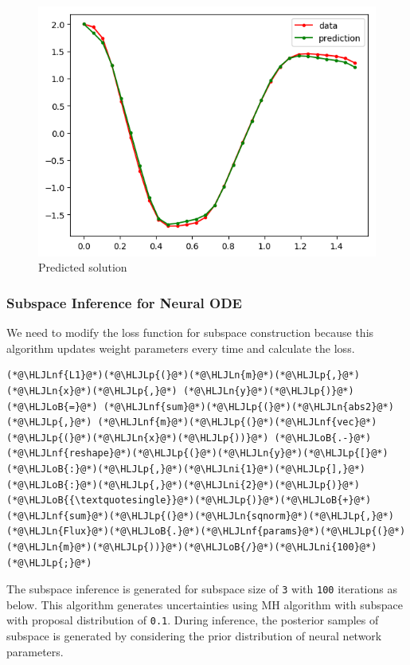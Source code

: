\documentclass[12pt,a4paper]{article}
\newcommand{\HLJLn}[1]{#1}
\newcommand{\HLJLnf}[1]{\textcolor[RGB]{66,102,213}{#1}}
\newcommand{\HLJLni}[1]{\textcolor[RGB]{59,151,46}{#1}}
\newcommand{\HLJLoB}[1]{\textcolor[RGB]{102,102,102}{\textbf{#1}}}
\newcommand{\HLJLp}[1]{#1}
\begin{document}
\begin{figure}
\centering
\includegraphics{img/n_ode_trained.png}
\caption{Predicted solution}
\end{figure}


\subsubsection{Subspace Inference for Neural ODE}
We need to modify the loss function for subspace construction because this algorithm updates weight parameters every time and calculate the loss.


\begin{lstlisting}
(*@\HLJLnf{L1}@*)(*@\HLJLp{(}@*)(*@\HLJLn{m}@*)(*@\HLJLp{,}@*) (*@\HLJLn{x}@*)(*@\HLJLp{,}@*) (*@\HLJLn{y}@*)(*@\HLJLp{)}@*) (*@\HLJLoB{=}@*) (*@\HLJLnf{sum}@*)(*@\HLJLp{(}@*)(*@\HLJLn{abs2}@*)(*@\HLJLp{,}@*) (*@\HLJLnf{m}@*)(*@\HLJLp{(}@*)(*@\HLJLnf{vec}@*)(*@\HLJLp{(}@*)(*@\HLJLn{x}@*)(*@\HLJLp{))}@*) (*@\HLJLoB{.-}@*) (*@\HLJLnf{reshape}@*)(*@\HLJLp{(}@*)(*@\HLJLn{y}@*)(*@\HLJLp{[}@*)(*@\HLJLoB{:}@*)(*@\HLJLp{,}@*)(*@\HLJLni{1}@*)(*@\HLJLp{],}@*) (*@\HLJLoB{:}@*)(*@\HLJLp{,}@*)(*@\HLJLni{2}@*)(*@\HLJLp{)}@*)(*@\HLJLoB{{\textquotesingle}}@*)(*@\HLJLp{)}@*)(*@\HLJLoB{+}@*)(*@\HLJLnf{sum}@*)(*@\HLJLp{(}@*)(*@\HLJLn{sqnorm}@*)(*@\HLJLp{,}@*) (*@\HLJLn{Flux}@*)(*@\HLJLoB{.}@*)(*@\HLJLnf{params}@*)(*@\HLJLp{(}@*)(*@\HLJLn{m}@*)(*@\HLJLp{))}@*)(*@\HLJLoB{/}@*)(*@\HLJLni{100}@*)(*@\HLJLp{;}@*)
\end{lstlisting}

The subspace inference is generated for subspace size of \texttt{3} with \texttt{100} iterations as below. This algorithm generates uncertainties using MH algorithm with subspace with proposal distribution of \texttt{0.1}. During inference, the posterior samples of subspace is generated by considering the prior distribution of neural network parameters.
\end{document}
